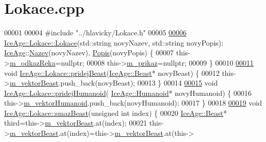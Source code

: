 \hypertarget{Lokace_8cpp_source}{}\section{Lokace.\+cpp}
\label{Lokace_8cpp_source}

\begin{DoxyCode}
00001 
00004 \textcolor{preprocessor}{#include "../hlavicky/Lokace.h"}
00005 
\hypertarget{Lokace_8cpp_source.tex_l00006}{}\hyperlink{classIceAge_1_1Lokace_ac8c6fe0d55e08b16e7f220b4aa969bf9}{00006} \hyperlink{classIceAge_1_1Lokace_ac8c6fe0d55e08b16e7f220b4aa969bf9}{IceAge::Lokace::Lokace}(std::string novyNazev, std::string novyPopis):
      \hyperlink{namespaceIceAge}{IceAge}::\hyperlink{classIceAge_1_1Nazev}{Nazev}(novyNazev), \hyperlink{classIceAge_1_1Popis}{Popis}(novyPopis) \{
00007     this->\hyperlink{classIceAge_1_1Lokace_a7b773f479641e323d55d1c935f238af4}{m\_odkazReka}=\textcolor{keyword}{nullptr};
00008     this->\hyperlink{classIceAge_1_1Lokace_a834dbd24600fee5d9962aa40564a8587}{m\_prikaz}=\textcolor{keyword}{nullptr};
00009 \}
00010 
\hypertarget{Lokace_8cpp_source.tex_l00011}{}\hyperlink{classIceAge_1_1Lokace_ae77a73c9d4ca11a4ccbd056e80e68318}{00011} \textcolor{keywordtype}{void} \hyperlink{classIceAge_1_1Lokace_ae77a73c9d4ca11a4ccbd056e80e68318}{IceAge::Lokace::pridejBeast}(\hyperlink{classIceAge_1_1Beast}{IceAge::Beast}* novyBeast) \{
00012     this->\hyperlink{classIceAge_1_1Lokace_a5dcb719c38dae7d7600a868bc40a0380}{m\_vektorBeast}.push\_back(novyBeast);
00013 \}
00014 
\hypertarget{Lokace_8cpp_source.tex_l00015}{}\hyperlink{classIceAge_1_1Lokace_ab8da7a4fa629d827d0b633c67d65da4e}{00015} \textcolor{keywordtype}{void} \hyperlink{classIceAge_1_1Lokace_ab8da7a4fa629d827d0b633c67d65da4e}{IceAge::Lokace::pridejHumanoid}(
      \hyperlink{classIceAge_1_1Humanoid}{IceAge::Humanoid}* novyHumanoid) \{
00016     this->\hyperlink{classIceAge_1_1Lokace_a777a6a3ae16e84b9843b9b18912014d2}{m\_vektorHumanoid}.push\_back(novyHumanoid);
00017 \}
00018 
\hypertarget{Lokace_8cpp_source.tex_l00019}{}\hyperlink{classIceAge_1_1Lokace_a7de7eb0ffccd14cc461788a987545ba8}{00019} \textcolor{keywordtype}{void} \hyperlink{classIceAge_1_1Lokace_a7de7eb0ffccd14cc461788a987545ba8}{IceAge::Lokace::smazBeast}(\textcolor{keywordtype}{unsigned} \textcolor{keywordtype}{int} index) \{
00020     \hyperlink{classIceAge_1_1Beast}{IceAge::Beast}* third=this->\hyperlink{classIceAge_1_1Lokace_a5dcb719c38dae7d7600a868bc40a0380}{m\_vektorBeast}.at(index);
00021     this->\hyperlink{classIceAge_1_1Lokace_a5dcb719c38dae7d7600a868bc40a0380}{m\_vektorBeast}.at(index)=this->\hyperlink{classIceAge_1_1Lokace_a5dcb719c38dae7d7600a868bc40a0380}{m\_vektorBeast}.at(this->

\end{DoxyCode}
